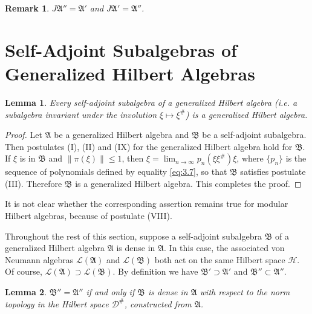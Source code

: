 \documentclass[12pt,b5paper,twoside]{article}
\theoremstyle{takesaki}
\newtheorem{lemma}{Lemma}[section]
\newtheorem*{remark}{Remark}
\numberwithin{equation}{section}
\begin{document}
\begin{remark}
$J\mathfrak A''=\mathfrak A'$ and $J\mathfrak A'=\mathfrak A''$.
\end{remark}

\section{Self-Adjoint Subalgebras of Generalized Hilbert Algebras}
\label{sec:5}

\begin{lemma}\label{lem:5.1}
Every self-adjoint subalgebra of a generalized Hilbert algebra (i.e. a
subalgebra invariant under the involution $\xi\mapsto\xi^\#$) is a
generalized Hilbert algebra.
\end{lemma}

\begin{proof}
Let $\mathfrak A$ be a generalized Hilbert algebra and $\mathfrak B$ be
a self-adjoint subalgebra.  Then postulates (I), (II) and (IX) for the
generalized Hilbert algebra hold for $\mathfrak B$.  If $\xi$ is in
$\mathfrak B$ and $\|\pi(\xi)\|\leq1$, then
$\xi=\lim_{n\to\infty}p_n(\xi\xi^\#)\xi$, where $\{p_n\}$ is the
sequence of polynomials defined by equality \eqref{eq:3.7}, so that
$\mathfrak B$ satisfies postulate (III).  Therefore $\mathfrak B$ is a
generalized Hilbert algebra.  This completes the proof.
\end{proof}

It is not clear whether the corresponding assertion remains true for
modular Hilbert algebras, because of postulate (VIII).

Throughout the rest of this section, suppose a self-adjoint subalgebra
$\mathfrak B$ of a generalized Hilbert algebra $\mathfrak A$ is dense
in $\mathfrak A$.  In this case, the associated von Neumann algebras
$\mathcal L(\mathfrak A)$ and $\mathcal L(\mathfrak B)$ both act on the
same Hilbert space $\mathcal H$.  Of course,
$\mathcal L(\mathfrak A)\supset\mathcal L(\mathfrak B)$.  By definition
we have $\mathfrak B'\supset\mathfrak A'$ and
$\mathfrak B''\subset\mathfrak A''$.

\begin{lemma}\label{lem:5.2}
$\mathfrak B''=\mathfrak A''$ if and only if $\mathfrak B$ is dense in
$\mathfrak A$ with respect to the norm topology in the Hilbert space
$\mathcal D^\#$, constructed from $\mathfrak A$.
\end{lemma}
\end{document}

